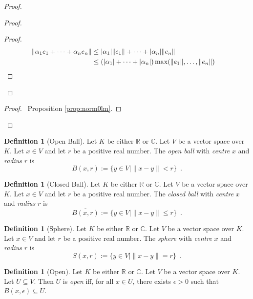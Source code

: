 \documentclass{book}
\let\qed\relax
\theoremstyle{definition}
\newtheorem{df}[ax]{Definition}
\begin{document}
\begin{proof}
\begin{proof}
	\begin{proof}
		\pf
		\begin{align*}
			\| \alpha_1 e_1 + \cdots + \alpha_n e_n \|
			& \leq |\alpha_1| \| e_1 \| + \cdots + |\alpha_n| \|e_n\| \\
			& \leq (|\alpha_1| + \cdots + |\alpha_n|) \max(\|e_1\|, \ldots, \|e_n\|) & \qed
		\end{align*}
	\end{proof}
\end{proof}
\begin{proof}
	\pf\ Proposition \ref{prop:norm0lm}.
\end{proof}
\qed
\end{proof}

\begin{df}[Open Ball]
Let $K$ be either $\mathbb{R}$ or $\mathbb{C}$. Let $V$ be a vector space over $K$. Let $x \in V$ and let $r$ be a positive real number. The \emph{open ball} with \emph{centre} $x$ and \emph{radius} $r$ is
\[ B(x,r) := \{ y \in V \mid \| x - y \| < r \} \enspace . \]
\end{df}

\begin{df}[Closed Ball]
Let $K$ be either $\mathbb{R}$ or $\mathbb{C}$. Let $V$ be a vector space over $K$. Let $x \in V$ and let $r$ be a positive real number. The \emph{closed ball} with \emph{centre} $x$ and \emph{radius} $r$ is
\[ \overline{B(x,r)} := \{ y \in V \mid \| x - y \| \leq r \} \enspace . \]
\end{df}

\begin{df}[Sphere]
Let $K$ be either $\mathbb{R}$ or $\mathbb{C}$. Let $V$ be a vector space over $K$. Let $x \in V$ and let $r$ be a positive real number. The \emph{sphere} with \emph{centre} $x$ and \emph{radius} $r$ is
\[ S(x,r) := \{ y \in V \mid \| x - y \| = r \} \enspace . \]
\end{df}

\begin{df}[Open]
Let $K$ be either $\mathbb{R}$ or $\mathbb{C}$. Let $V$ be a vector space over $K$. Let $U \subseteq V$. Then $U$ is \emph{open} iff, for all $x \in U$, there exists $\epsilon > 0$ such that $B(x,\epsilon) \subseteq U$.
\end{df}
\end{document}
